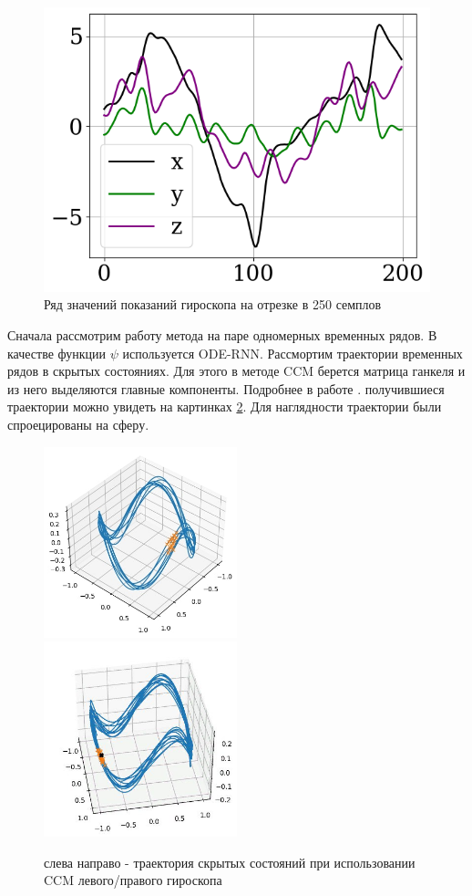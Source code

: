 \documentclass[12pt, twoside]{article}
\begin{document}
\begin{figure}
	\centering
	\includegraphics[scale=0.75]{images/ряд.jpg} 
	\caption{Ряд значений показаний гироскопа на отрезке в 250 семплов \label{ряд}}
\end{figure}


	Сначала рассмотрим работу метода на паре одномерных временных рядов. В качестве функции $\psi$ используется ODE-RNN.
	Рассмортим траектории временных рядов в скрытых состояниях. Для этого в методе CCM берется матрица ганкеля и из него выделяются главные компоненты. Подробнее в работе \cite{Usmanova2018}.  
	получившиеся траектории можно увидеть на картинках \ref{trajectory}. Для наглядности траектории были спроецированы на сферу.
	
\begin{figure}
	\includegraphics[width = 0.5\textwidth]{images/trajectory_CCM.jpg} \hfill
	\includegraphics[width = 0.5\textwidth]{images/trajectory_CCM_right.jpg}
	\caption{слева направо - траектория скрытых состояний при использовании CCM левого/правого гироскопа\label{trajectory}}
\end{figure}
	
\end{document}
